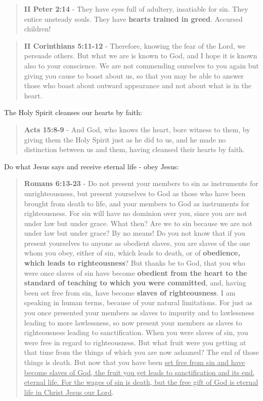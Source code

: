 \documentclass[11pt]{article}
\begin{document}
\begin{quote}
\textbf{II Peter 2:14} - They have eyes full of adultery, insatiable for sin. They entice unsteady souls. They have \textbf{hearts trained in greed}. Accursed children!
\end{quote}

\begin{quote}
\textbf{II Corinthians 5:11-12} - Therefore, knowing the fear of the Lord, we persuade others. But what we are is known to God, and I hope it is known also to your conscience. We are not commending ourselves to you again but giving you cause to boast about us, so that you may be able to answer those who boast about outward appearance and not about what is in the heart.
\end{quote}

The Holy Spirit cleanses our hearts by faith:

\begin{quote}
\textbf{Acts 15:8-9} - And God, who knows the heart, bore witness to them, by giving them the Holy Spirit just as he did to us, and he made no distinction between us and them, having cleansed their hearts by faith.
\end{quote}

Do what Jesus says and receive eternal life - obey Jesus:

\begin{quote}
\textbf{Romans 6:13-23} - Do not present your members to sin as instruments for unrighteousness, but present yourselves to God as those who have been brought from death to life, and your members to God as instruments for righteousness.  For sin will have no dominion over you, since you are not under law but under grace.  What then? Are we to sin because we are not under law but under grace? By no means!  Do you not know that if you present yourselves to anyone as obedient slaves, you are slaves of the one whom you obey, either of sin, which leads to death, or of \textbf{obedience, which leads to righteousness}?  But thanks be to God, that you who were once slaves of sin have become \textbf{obedient from the heart to the standard of teaching to which you were committed}, and, having been set free from sin, have become \textbf{slaves of righteousness}.  I am speaking in human terms, because of your natural limitations. For just as you once presented your members as slaves to impurity and to lawlessness leading to more lawlessness, so now present your members as slaves to righteousness leading to sanctification.  When you were slaves of sin, you were free in regard to righteousness.  But what fruit were you getting at that time from the things of which you are now ashamed? The end of those things is death.  But now that you have been \uline{set free from sin and have become slaves of God, the fruit you get leads to sanctification and its end, eternal life.  For the wages of sin is death, but the free gift of God is eternal life in Christ Jesus our Lord}.
\end{quote}
\end{document}
